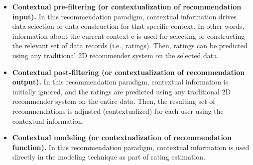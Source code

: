 \begin{itemize}
\item  \textbf{Contextual pre-filtering (or contextualization of
recommendation input).} In this recommendation paradigm, contextual
information drives data selection or data construction for that specific
context. In other words, information about the current context c is used for
selecting or constructing the relevant set of data records (i.e., ratings).
Then, ratings can be predicted using any traditional 2D recommender system 
on the selected data.   	
\item \textbf{Contextual post-filtering (or contextualization of recommendation
output).} In this recommendation paradigm, contextual information is initially
ignored, and the ratings are predicted using any traditional 2D recommender
system on the entire data. Then, the resulting set of recommendations is
adjusted (contextualized) for each user using the contextual information.
\item \textbf{Contextual modeling (or contextualization of recommendation
function).} In this recommendation paradigm, contextual information is used
directly in the modeling technique as part of rating estimation.
\end{itemize}



